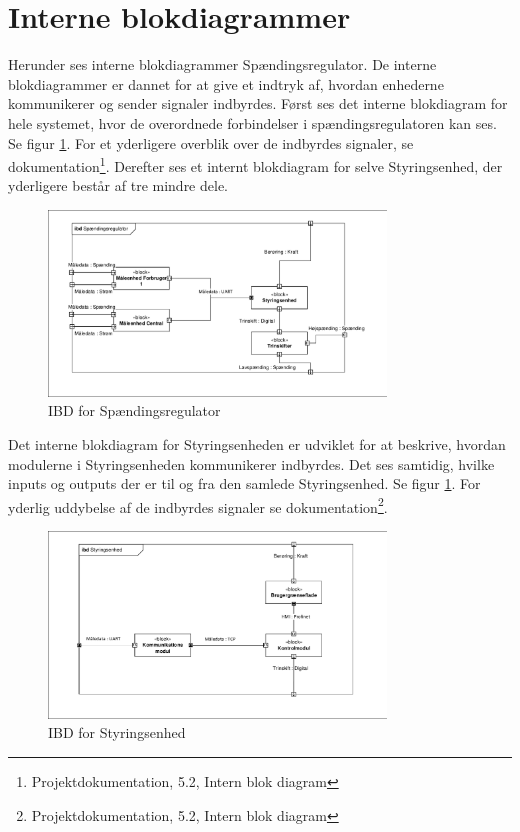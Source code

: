 

\section{Interne blokdiagrammer}

Herunder ses interne blokdiagrammer Spændingsregulator. De interne blokdiagrammer er dannet for at give et indtryk af, hvordan enhederne kommunikerer og sender signaler indbyrdes. Først ses det interne blokdiagram for hele systemet, hvor de overordnede forbindelser i spændingsregulatoren kan ses. Se figur \ref{fig:IBDSp}. For et yderligere overblik over de indbyrdes signaler, se dokumentation\footnote{Projektdokumentation, 5.2, Intern blok diagram}.  Derefter ses et internt blokdiagram for selve Styringsenhed, der yderligere består af tre mindre dele. 

\begin{figure}[htbp] %
	\centering
	\includegraphics[width=0.8\textwidth]{figure/IBDSpaendingsregulator.pdf}
	\caption{IBD for Spændingsregulator}
	\label{fig:IBDSp}
\end{figure}

Det interne blokdiagram for Styringsenheden er udviklet for at beskrive, hvordan modulerne i Styringsenheden kommunikerer indbyrdes. Det ses samtidig, hvilke inputs og outputs der er til og fra den samlede Styringsenhed. Se figur \ref{fig:IBDSp}. For yderlig uddybelse af de indbyrdes signaler se dokumentation\footnote{Projektdokumentation, 5.2, Intern blok diagram}.


\begin{figure}[htbp] %
	\centering
	\includegraphics[width=0.8\textwidth]{figure/IBDStyringsenhed.pdf}
	\caption{IBD for Styringsenhed}
	\label{fig:IBDSt}
\end{figure}





